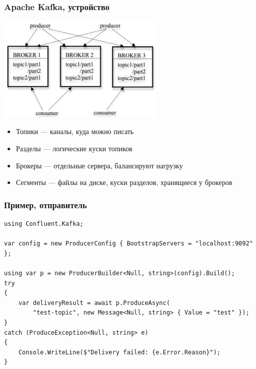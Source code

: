 \documentclass{../../slides-style}
\begin{document}
    \begin{frame}
        \frametitle{Apache Kafka, устройство}
        \begin{center}
            \includegraphics[width=0.6\textwidth]{kafkaArchitecture.png}
        \end{center}
        \begin{itemize}
            \item Топики --- каналы, куда можно писать
            \item Разделы --- логические куски топиков
            \item Брокеры --- отдельные сервера, балансируют нагрузку
            \item Сегменты --- файлы на диске, куски разделов, хранящиеся у брокеров
        \end{itemize}
    \end{frame}

    \begin{frame}[fragile]
        \frametitle{Пример, отправитель}
        \begin{small}
            \begin{verbatim}
using Confluent.Kafka;

var config = new ProducerConfig { BootstrapServers = "localhost:9092" };

using var p = new ProducerBuilder<Null, string>(config).Build();
try
{
    var deliveryResult = await p.ProduceAsync(
        "test-topic", new Message<Null, string> { Value = "test" });
}
catch (ProduceException<Null, string> e)
{
    Console.WriteLine($"Delivery failed: {e.Error.Reason}");
}
            \end{verbatim}
        \end{small}
    \end{frame}
\end{document}
